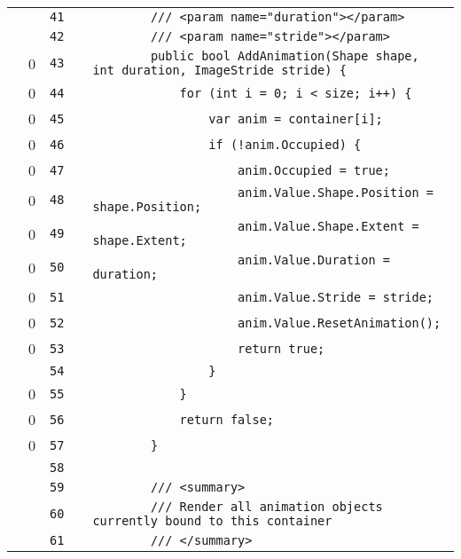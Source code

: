 \documentclass[a4paper,landscape,10pt]{article}
\begin{document}
\begin{longtable}[l]{lrrll}
\cellcolor{gray} &  & \verb~41~ & & \verb~        /// <param name="duration"></param>~\\
\cellcolor{gray} &  & \verb~42~ & & \verb~        /// <param name="stride"></param>~\\
\cellcolor{red} & 0 & \verb~43~ & & \verb~        public bool AddAnimation(Shape shape, int duration, ImageStride stride) {~\\
\cellcolor{red} & 0 & \verb~44~ & & \verb~            for (int i = 0; i < size; i++) {~\\
\cellcolor{red} & 0 & \verb~45~ & & \verb~                var anim = container[i];~\\
\cellcolor{red} & 0 & \verb~46~ & & \verb~                if (!anim.Occupied) {~\\
\cellcolor{red} & 0 & \verb~47~ & & \verb~                    anim.Occupied = true;~\\
\cellcolor{red} & 0 & \verb~48~ & & \verb~                    anim.Value.Shape.Position = shape.Position;~\\
\cellcolor{red} & 0 & \verb~49~ & & \verb~                    anim.Value.Shape.Extent = shape.Extent;~\\
\cellcolor{red} & 0 & \verb~50~ & & \verb~                    anim.Value.Duration = duration;~\\
\cellcolor{red} & 0 & \verb~51~ & & \verb~                    anim.Value.Stride = stride;~\\
\cellcolor{red} & 0 & \verb~52~ & & \verb~                    anim.Value.ResetAnimation();~\\
\cellcolor{red} & 0 & \verb~53~ & & \verb~                    return true;~\\
\cellcolor{gray} &  & \verb~54~ & & \verb~                }~\\
\cellcolor{red} & 0 & \verb~55~ & & \verb~            }~\\
\cellcolor{red} & 0 & \verb~56~ & & \verb~            return false;~\\
\cellcolor{red} & 0 & \verb~57~ & & \verb~        }~\\
\cellcolor{gray} &  & \verb~58~ & & \verb~~\\
\cellcolor{gray} &  & \verb~59~ & & \verb~        /// <summary>~\\
\cellcolor{gray} &  & \verb~60~ & & \verb~        /// Render all animation objects currently bound to this container~\\
\cellcolor{gray} &  & \verb~61~ & & \verb~        /// </summary>~\\

\end{longtable}
\end{document}
